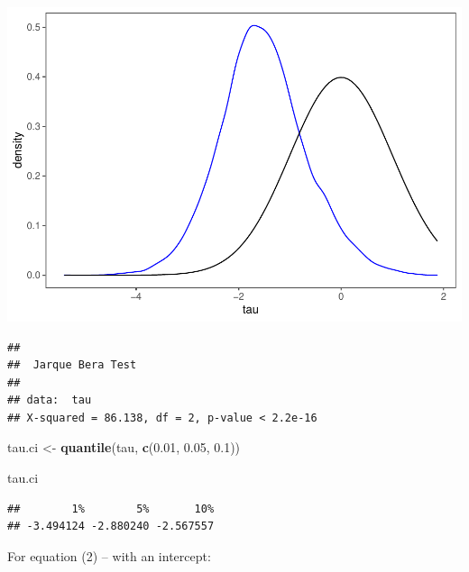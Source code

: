 \documentclass[
]{article}
\newenvironment{Shaded}{\begin{snugshade}}{\end{snugshade}}
\newcommand{\CommentTok}[1]{\textcolor[rgb]{0.56,0.35,0.01}{\textit{#1}}}
\newcommand{\FloatTok}[1]{\textcolor[rgb]{0.00,0.00,0.81}{#1}}
\newcommand{\KeywordTok}[1]{\textcolor[rgb]{0.13,0.29,0.53}{\textbf{#1}}}
\newcommand{\NormalTok}[1]{#1}
\newcommand{\StringTok}[1]{\textcolor[rgb]{0.31,0.60,0.02}{#1}}
\begin{document}
\begin{center}\includegraphics{Econo2_P6_files/figure-latex/monte carlo 1-2} \end{center}

\begin{Shaded}
\end{Shaded}

\begin{verbatim}
## 
##  Jarque Bera Test
## 
## data:  tau
## X-squared = 86.138, df = 2, p-value < 2.2e-16
\end{verbatim}

\begin{Shaded}
\begin{Highlighting}[]
\NormalTok{tau.ci <-}\StringTok{ }\KeywordTok{quantile}\NormalTok{(tau, }\KeywordTok{c}\NormalTok{(}\FloatTok{0.01}\NormalTok{, }\FloatTok{0.05}\NormalTok{, }\FloatTok{0.1}\NormalTok{))}

\NormalTok{tau.ci}
\end{Highlighting}
\end{Shaded}

\begin{verbatim}
##        1%        5%       10% 
## -3.494124 -2.880240 -2.567557
\end{verbatim}

For equation (2) -- with an intercept:
\end{document}
